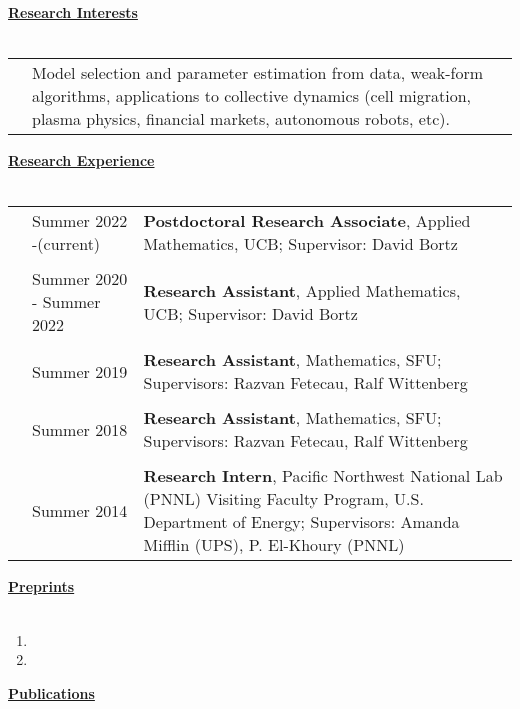 \documentclass[letterpaper,11pt,oneside]{article}
\newcommand{\headr}[1]{\vspace{10pt}\uline{\Large{\textbf{#1}} \hfill } \\ \vspace{-10pt}\\}
\begin{document}
\headr{Research Interests}

\begin{tabular}{@{} p{0.01cm} @{} p{16.5cm}@{} }
 & Model selection and parameter estimation from data, weak-form algorithms, applications to collective dynamics (cell migration, plasma physics, financial markets, autonomous robots, etc).
\end{tabular}

\headr{Research Experience}

\begin{tabular}{@{} p{0.01cm} @{} p{5.5cm} @{} p{12.5cm}@{} }
& Summer 2022 -\newline (current)  & 
\textbf{Postdoctoral Research Associate}, Applied Mathematics, UCB;\newline
Supervisor: David Bortz \\
& & \\
& Summer 2020 - \newline Summer 2022  & 
\textbf{Research Assistant}, Applied Mathematics, UCB; \newline
Supervisor: David Bortz \\
&     & \\
& Summer 2019  & 
\textbf{Research Assistant}, Mathematics, SFU;
\newline Supervisors: Razvan Fetecau, Ralf Wittenberg \\
&     & \\
& Summer 2018  & 
\textbf{Research Assistant}, Mathematics, SFU;
\newline Supervisors: Razvan Fetecau, Ralf Wittenberg \\
&     & \\
& Summer 2014  & 
\textbf{Research Intern},  Pacific Northwest National Lab (PNNL) 
\newline Visiting Faculty Program, U.S. Department of Energy;
\newline Supervisors: Amanda Mifflin (UPS), P. El-Khoury (PNNL) 
\end{tabular}




\headr{Preprints}
\begin{enumerate}
\item {}
\item {}
\end{enumerate}

\headr{Publications}
\end{document}
